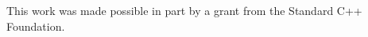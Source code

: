 \setcounter{chapter}{0}

This work was made possible in part by a grant from the Standard C++
Foundation.
